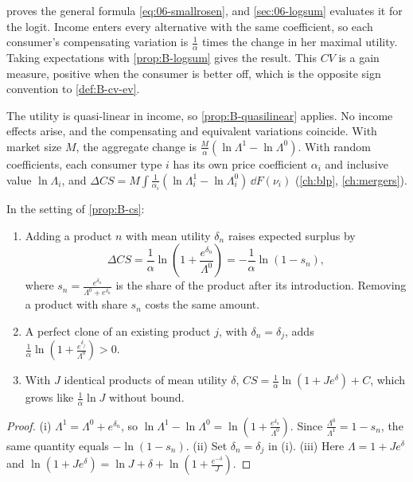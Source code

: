  proves the general formula \eqref{eq:06-smallrosen}, and \cref{sec:06-logsum} evaluates it
for the logit. Income enters every alternative with the same coefficient, so each consumer's compensating
variation is $\frac{1}{\alpha}$ times the change in her maximal utility. Taking expectations with
\cref{prop:B-logsum} gives the result. This $CV$ is a gain measure, positive when the consumer is better off,
which is the opposite sign convention to \cref{def:B-cv-ev}.

The utility is quasi-linear in income, so \cref{prop:B-quasilinear} applies. No income effects arise, and
the compensating and equivalent variations coincide. With market size $M$, the aggregate change is
$\frac{M}{\alpha}(\ln\Lambda^1 - \ln\Lambda^0)$. With random coefficients, each consumer type $i$ has its own price
coefficient $\alpha_i$ and inclusive value $\ln\Lambda_i$, and
$\Delta CS = M\int\frac{1}{\alpha_i}(\ln\Lambda_i^1 - \ln\Lambda_i^0)\,\dd F(\nu_i)$ (\cref{ch:blp}, \cref{ch:mergers}).

\begin{corollary}\label{cor:B-value-product}
In the setting of \cref{prop:B-cs}:
\begin{enumerate}[label=(\roman*)]
\item Adding a product $n$ with mean utility $\delta_n$ raises expected surplus by
\begin{equation}\label{eq:B-value-new}
\Delta CS = \frac{1}{\alpha}\ln\left(1 + \frac{e^{\delta_n}}{\Lambda^0}\right) = -\frac{1}{\alpha}\ln(1 - s_n),
\end{equation}
  where $s_n = \frac{e^{\delta_n}}{\Lambda^0 + e^{\delta_n}}$ is the share of the product after its introduction.
  Removing a product with share $s_n$ costs the same amount.
\item A perfect clone of an existing product $j$, with $\delta_n = \delta_j$, adds
  $\frac{1}{\alpha}\ln\left(1 + \frac{e^{\delta_j}}{\Lambda^0}\right) > 0$.
\item With $J$ identical products of mean utility $\delta$, $CS = \frac{1}{\alpha}\ln(1 + Je^\delta) + C$, which grows
  like $\frac{1}{\alpha}\ln J$ without bound.
\end{enumerate}
\end{corollary}

\begin{proof}
(i) $\Lambda^1 = \Lambda^0 + e^{\delta_n}$, so $\ln\Lambda^1 - \ln\Lambda^0 = \ln\left(1 + \frac{e^{\delta_n}}{\Lambda^0}\right)$. Since
$\frac{\Lambda^0}{\Lambda^1} = 1 - s_n$, the same quantity equals $-\ln(1 - s_n)$. (ii) Set $\delta_n = \delta_j$ in (i).
(iii) Here $\Lambda = 1 + Je^\delta$ and $\ln(1 + Je^\delta) = \ln J + \delta + \ln(1 + \frac{e^{-\delta}}{J})$.
\end{proof}

